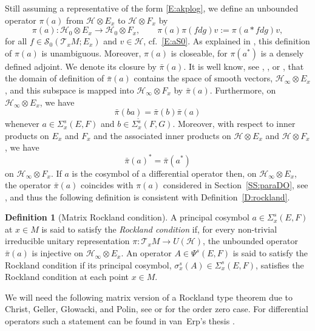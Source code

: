 \documentclass[reqno,12pt]{amsart}
\theoremstyle{plain}
\theoremstyle{definition}
\newtheorem{definition}[theorem]{Definition}
\begin{document}
Still assuming a representative of the form \eqref{E:akplog}, we define an unbounded operator $\pi(a)$ from $\mathcal H\otimes E_x$ to $\mathcal H\otimes F_x$ by
$$
\pi(a)\colon\mathcal H_0\otimes E_x\to\mathcal H_0\otimes F_x,\qquad\pi(a)\pi(fdg)v:=\pi(a*fdg)v,
$$ 
for all $f\in\mathcal S_0(\mathcal T_xM;E_x)$ and $v\in\mathcal H$, cf.~\eqref{E:aS0}.
As explained in \cite[Section~2]{CGGP92}, this definition of $\pi(a)$ is unambiguous.
Moreover, $\pi(a)$ is closeable, for $\pi(a^*)$ is a densely defined adjoint.
We denote its closure by $\bar\pi(a)$.
It is well know, see \cite{CGGP92}, \cite{G91}, or \cite[Proposition~3.3.6]{P08}, that the domain of definition of $\bar\pi(a)$ contains the space of smooth vectors, $\mathcal H_\infty\otimes E_x$, and this subspace is mapped into $\mathcal H_\infty\otimes F_x$ by $\bar\pi(a)$.
Furthermore, on $\mathcal H_\infty\otimes E_x$, we have
\begin{equation}\label{E:piab}
\bar\pi(ba)=\bar\pi(b)\bar\pi(a)
\end{equation}
whenever $a\in\Sigma^s_x(E,F)$ and $b\in\Sigma^{\tilde s}_x(F,G)$.
Moreover, with respect to inner products on $E_x$ and $F_x$ and the associated inner products on $\mathcal H\otimes E_x$ and $\mathcal H\otimes F_x$, we have 
\begin{equation}\label{E:pia*}
\bar\pi(a)^*=\bar\pi(a^*)
\end{equation}
on $\mathcal H_\infty\otimes F_x$.
If $a$ is the cosymbol of a differential operator then, on $\mathcal H_\infty\otimes E_x$, the operator $\bar\pi(a)$ coincides with $\pi(a)$ considered in Section~\ref{SS:paraDO}, see \cite[Remark~3.3.7]{P08}, and thus the following definition is consistent with Definition~\ref{D:rockland}.


\begin{definition}[Matrix Rockland condition]\label{D:Rockland}
A principal cosymbol $a\in\Sigma_x^s(E,F)$ at $x\in M$ is said to satisfy the \emph{Rockland condition} if, for every non-trivial irreducible unitary representation $\pi\colon\mathcal T_xM\to U(\mathcal H)$, the unbounded operator $\bar\pi(a)$ is injective on $\mathcal H_\infty\otimes E_x$. 
An operator $A\in\Psi^s(E,F)$ is said to satisfy the Rockland condition if its principal cosymbol, $\sigma^s_x(A)\in\Sigma^s_x(E,F)$, satisfies the Rockland condition at each point $x\in M$.
\end{definition}
  

We will need the following matrix version of a Rockland \cite{R78} type theorem due to Christ, Geller, G{\l}owacki, and Polin, see \cite[Theorem~6.2]{CGGP92} or \cite{G91} for the order zero case.
For differential operators such a statement can be found in van~Erp's thesis \cite{E05}.
\end{document}
